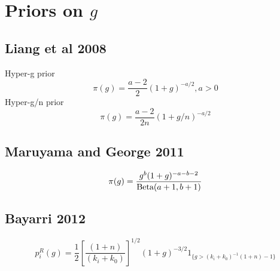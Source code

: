 \documentclass{amsart}[12pt]
\theoremstyle{definition}
\begin{document}
\section{Priors on $g$}

\subsection{Liang et al 2008}
Hyper-g prior
$$\pi(g) = \frac{a - 2}{2} (1 + g)^{-a/2}, a > 0$$
Hyper-g/n prior
$$\pi(g) = \frac{a - 2}{2n} (1 + g/n)^{-a/2}$$
\subsection{Maruyama and George 2011}
$$\pi(g) = \frac{g^b (1 + g)^{-a-b-2}}{\text{Beta}(a + 1, b + 1)}$$
\subsection{Bayarri 2012}
$$p_i^R(g) = \frac{1}{2} \left[ \frac{(1 + n)}{(k_i + k_0)} \right]^{1/2} (1 + g)^{-3/2} 1_{\{ g > (k_i + k_0)^{-1} (1 + n) - 1 \}}$$


\end{document}
